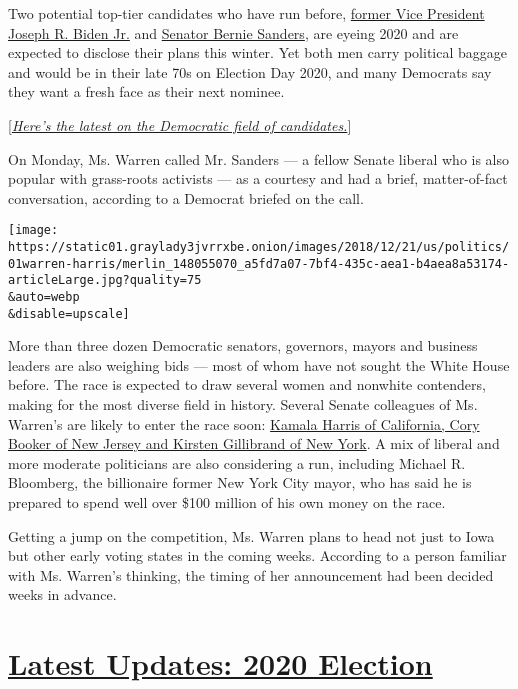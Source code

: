 Two potential top-tier candidates who have run before,
\href{https://www.nytimes3xbfgragh.onion/2018/10/01/us/politics/biden-2020-anita-hill-kavanaugh.html}{former
Vice President Joseph R. Biden Jr.} and
\href{https://www.nytimes3xbfgragh.onion/2018/12/27/us/politics/bernie-sanders-president-2020.html}{Senator
Bernie Sanders}, are eyeing 2020 and are expected to disclose their
plans this winter. Yet both men carry political baggage and would be in
their late 70s on Election Day 2020, and many Democrats say they want a
fresh face as their next nominee.

{[}\emph{\href{https://www.nytimes3xbfgragh.onion/2018/12/31/us/politics/2020-democratic-candidates.html}{Here's
the latest on the Democratic field of candidates.}}{]}

On Monday, Ms. Warren called Mr. Sanders --- a fellow Senate liberal who
is also popular with grass-roots activists --- as a courtesy and had a
brief, matter-of-fact conversation, according to a Democrat briefed on
the call.

\texttt{[image: https://static01.graylady3jvrrxbe.onion/images/2018/12/21/us/politics/01warren-harris/merlin\_148055070\_a5fd7a07-7bf4-435c-aea1-b4aea8a53174-articleLarge.jpg?quality=75\\\&auto=webp\\\&disable=upscale]}

More than three dozen Democratic senators, governors, mayors and
business leaders are also weighing bids --- most of whom have not sought
the White House before. The race is expected to draw several women and
nonwhite contenders, making for the most diverse field in history.
Several Senate colleagues of Ms. Warren's are likely to enter the race
soon:
\href{https://www.nytimes3xbfgragh.onion/2018/12/29/us/politics/2020-democratic-candidates-kamala-elizabeth-warren.html}{Kamala
Harris of California, Cory Booker of New Jersey and Kirsten Gillibrand
of New York}. A mix of liberal and more moderate politicians are also
considering a run, including Michael R. Bloomberg, the billionaire
former New York City mayor, who has said he is prepared to spend well
over \$100 million of his own money on the race.

Getting a jump on the competition, Ms. Warren plans to head not just to
Iowa but other early voting states in the coming weeks. According to a
person familiar with Ms. Warren's thinking, the timing of her
announcement had been decided weeks in advance.

\hypertarget{latest-updates-2020-election}{%
\section{\texorpdfstring{\href{https://www.nytimes3xbfgragh.onion/live/2020/08/19/us/dnc-convention-election?action=click\&pgtype=Article\&state=default\&region=MAIN_CONTENT_1\&context=storylines_live_updates}{Latest
Updates: 2020
Election}}{Latest Updates: 2020 Election}}\label{latest-updates-2020-election}}

